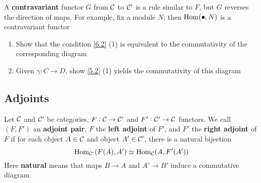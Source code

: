 \documentclass[11pt]{article}
\begin{document}
A \textbf{contravariant} functor \(G\) from \(\mathcal{C}\) to \(\mathcal{C}'\) is a rule similar
to \(F\), but \(G\) reverses the direction of maps. For example, fix a module
\(N\); then \(\operatorname{Hom}(\bullet,N)\) is a contravariant functor

\begin{exercise}
\label{6.3}
\begin{enumerate}
\item Show that the condition \ref{6.2} (1) is equivalent to the commutativity of
the corresponding diagram
\begin{center}
\end{center}
\item Given \(\gamma:C\to D\), show \ref{5.2} (1) yields the commutativity of this
diagram
\begin{center}
\end{center}
\end{enumerate}
\end{exercise}
\subsection*{Adjoints \label{6.4}}
\label{sec:org894ed81}
Let \(\mathcal{C}\) and \(\mathcal{C}'\) be categories, \(F:\mathcal{C}\to\mathcal{C}'\) and
\(F':\mathcal{C}'\to\mathcal{C}\) functors. We call \((F,F')\) an \textbf{adjoint pair}, \(F\) the
\textbf{left adjoint} of \(F'\), and \(F'\) the \textbf{right adjoint} of \(F\) if for each
object \(A\in\mathcal{C}\) and object \(A'\in\mathcal{C}'\), there is a natural bijection
\begin{equation*}
\operatorname{Hom}_{\mathcal{C}'}(F(A),A')\simeq\operatorname{Hom}_{\mathcal{C}}(A,F'(A'))
\end{equation*}
Here \textbf{natural} means that maps \(B\to A\) and \(A'\to B'\) induce a commutative
diagram
\begin{center}
\end{center}
\end{document}
